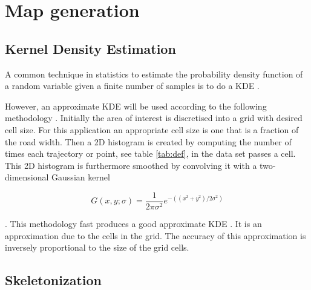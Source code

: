
\section{Map generation}

\subsection{Kernel Density Estimation}
\label{chp:theory.sec:kde}

A common technique in statistics to estimate the probability density function of a random variable given a finite number of samples is to do a \ac{KDE} \citep{terrell1992}.

However, an approximate \ac{KDE} will be used according to the following methodology \citep{4inBiagioni}. Initially the area of interest is discretised into a grid with desired cell size. For this application an appropriate cell size is one that is a fraction of the road width. Then a 2D histogram is created by computing the number of times each trajectory or point, see table \ref{tab:def}, in the data set passes a cell. This 2D histogram is furthermore smoothed by convolving it with a two-dimensional Gaussian kernel

\begin{equation}\label{eq:gaussian}
    G(x,y;\sigma) = \frac{1}{2\pi \sigma^2} e^{-((x^2+y^2)/2\sigma^2)}    
\end{equation}

\citep{bookImageAnalysis}. This methodology fast produces a good approximate \ac{KDE} \citep{biagioni:gis12}. It is an approximation due to the cells in the grid. The accuracy of this approximation is inversely proportional to the size of the grid cells.

\subsection{Skeletonization} 
\label{chp:theory.sec:mapgen.sub:skeleton}

